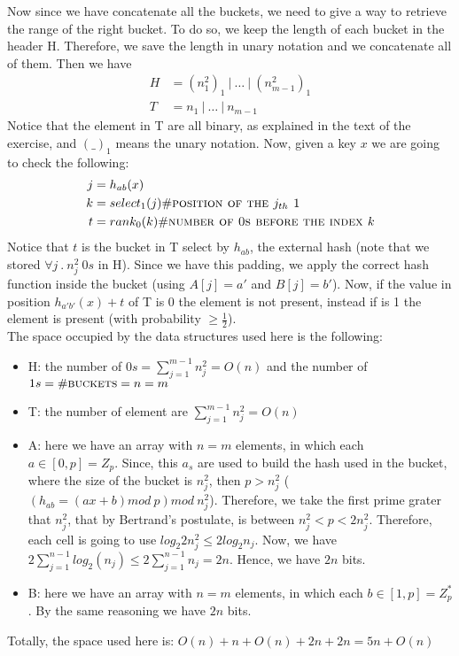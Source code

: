 \documentclass[a4paper]{article}
\begin{document}
Now since we have concatenate all the buckets, we need to give a way to retrieve the range of the right bucket. To do so, we keep the length of each bucket in the header H. Therefore, we save the length in unary notation and we concatenate all of them. Then we have
\begin{align*}
H &= (n_1^2)_1 \ | \ \dots \ | \ (n_{m-1}^2)_1 \\
T &= n_1 \ | \ \dots \ | \ n_{m-1}
\end{align*}
Notice that the element in T are all binary, as explained in the text of the exercise, and $(\_)_1$ means the unary notation. Now, given a key $x$ we are going to check the following: 
\begin{align*}
j & =h_{ab}(x)\\
k & = select_1(j) \# \textsc{position of the $j_{th}$ 1} \\
t & = rank_0(k) \# \textsc{number of 0s before the index $k$} \\
\end{align*}
Notice that $t$ is the bucket in T select by $h_{ab}$, the external hash (note that we stored $\forall j \ . \ n_j^2 \ 0s$ in H). Since we have this padding, we apply the correct hash function inside the bucket (using $A[j]=a'$ and $B[j]=b'$). Now, if the value in position $h_{a'b'}(x)+t$ of T is 0 the element is not present, instead if is 1 the element is present (with probability $\geq \frac{1}{2}$). \\
The space occupied by the data structures used here is the following:
\begin{itemize}
\item H: the number of $0s=\sum_{j=1}^{m-1}n_j^2=O(n)$ and the number of $1s=\#\textsc{buckets}=n=m$
\item T: the number of element are $\sum_{j=1}^{m-1}n_j^2=O(n)$
\item A: here we have an array with $n=m$ elements, in which each $a\in [0,p]=Z_p$. Since, this $a_s$ are used to build the hash used in the bucket, where the size of the bucket is $n_j^2$, then $p>n_j^2$ ($(h_{ab}=(ax+b)mod\ p) mod \ n_j^2$). Therefore, we take the first prime grater that $n_j^2$, that by Bertrand's postulate, is between $n_j^2< p< 2n_j^2$. Therefore, each cell is going to use $log_2 2n_j^2 \leq 2 log_2 n_j$. Now, we have $2\sum_{j=1}^{n-1}log_2(n_j)\leq 2\sum_{j=1}^{n-1}n_j=2n$. Hence, we have $2n$ bits.
\item B: here we have an array with $n=m$ elements, in which each $b\in[1,p]=Z_p^*$. By the same reasoning we have $2n$ bits.
\end{itemize}
Totally, the space used here is: $O(n)+n + O(n)+2n+2n=5n+O(n)$
\end{document}
